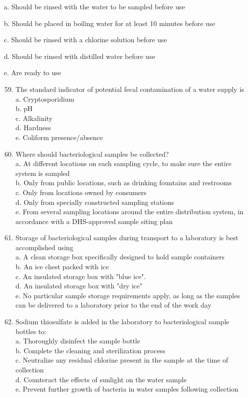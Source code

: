 \documentclass[10pt]{article}
\begin{document}
a. Should be rinsed with the water to be sampled before use

b. Should be placed in boiling water for at least 10 minutes before use

c. Should be rinsed with a chlorine solution before use

d. Should be rinsed with distilled water before use

e. Are ready to use

\begin{enumerate}
  \setcounter{enumi}{58}
  \item The standard indicator of potential fecal contamination of a water supply is\\
a. Cryptosporidium\\
b. $\mathrm{pH}$\\
c. Alkalinity\\
d. Hardness\\
e. Coliform presence/absence\\

  \item Where should bacteriological samples be collected?\\
a. At different locations on each sampling cycle, to make sure the entire system is sampled\\
b. Only from public locations, such as drinking fountains and restrooms\\
c. Only from locations owned by consumers\\
d. Only from specially constructed sampling stations\\
e. From several sampling locations around the entire distribution system, in accordance with a DHS-approved sample siting plan

  \item Storage of bacteriological samples during transport to a laboratory is best accomplished using\\
a. A clean storage box specifically designed to hold sample containers\\
b. An ice chest packed with ice\\
c. An insulated storage box with "blue ice".\\
d. An insulated storage box with "dry ice"\\
e. No particular sample storage requirements apply, as long as the samples can be delivered to a laboratory prior to the end of the work day\\

  \item Sodium thiosulfate is added in the laboratory to bacteriological sample bottles to:\\
a. Thoroughly disinfect the sample bottle\\
b. Complete the cleaning and sterilization process\\
c. Neutralize any residual chlorine present in the sample at the time of collection\\
d. Counteract the effects of sunlight on the water sample\\
e. Prevent further growth of bacteria in water samples following collection\\


\end{enumerate}
\end{document}
